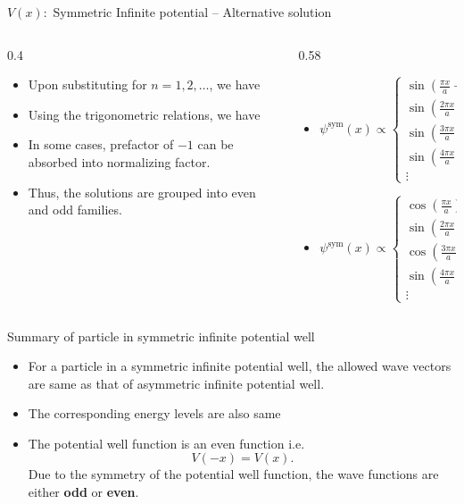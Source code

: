 \begin{frame}{\(V(x) :\) Symmetric Infinite potential -- Alternative solution}
%
\begin{columns}
	\begin{column}{0.4\textwidth}
		\begin{itemize}
			\item Upon substituting for \(n=1,2,\ldots\), we have
			\item Using the trigonometric relations, we have
			\item In some cases, prefactor of \(-1\) can be absorbed into normalizing factor.
			\item Thus, the solutions are grouped into even and odd families.
		\end{itemize}
	\end{column}
	\begin{column}{0.58\textwidth}
		\begin{itemize}
			\item 
			\[
			\psi^\text{sym}(x) \propto
			\left\{
			\begin{array}{ll}
				\sin\left(\frac{\pi x}{a} + \frac{\pi}{2} \right)	&	n=1	\\
				\sin\left(\frac{2\pi x}{a} + \frac{2\pi}{2} \right)	&	n=2	\\
				\sin\left(\frac{3\pi x}{a} + \frac{3\pi}{2} \right)	&	n=3	\\
				\sin\left(\frac{4\pi x}{a} + \frac{4\pi}{2} \right)	&	n=4	\\
				\vdots	&	\vdots
			\end{array}
			\right.
			\]
			\item 
			\[
			\psi^\text{sym}(x) \propto
			\left\{
			\begin{array}{ll}
				\cos\left(\frac{\pi x}{a}\right)	&	n=1	\\
				\sin\left(\frac{2\pi x}{a} \right)	&	n=2	\\
				\cos\left(\frac{3\pi x}{a} \right)	&	n=3	\\
				\sin\left(\frac{4\pi x}{a} \right)	&	n=4	\\
				\vdots	&	\vdots
			\end{array}
			\right.
			\]
		\end{itemize}
	\end{column}
\end{columns}
%
\end{frame}
%
\begin{frame}{Summary of particle in symmetric infinite potential well}
	\begin{itemize}
		\item For a particle in a symmetric infinite potential well, the allowed wave vectors are same as that of asymmetric infinite potential well.
		\item The corresponding energy levels are also same
		\item The potential well function is an even function i.e.
		\[
		V(-x) = V(x).
		\]
		Due to the symmetry of the potential well function, the wave functions are either \textbf{odd} or \textbf{even}.
	\end{itemize}
\end{frame}
